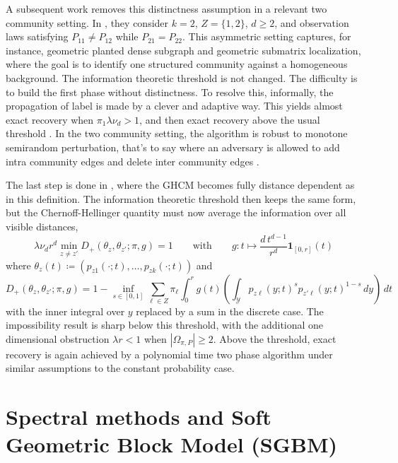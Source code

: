 \documentclass[runningheads]{llncs}
\begin{document}
A subsequent work removes this distinctness assumption in a relevant two community setting. In \citep{gaudio2025sharpexactrecoverythreshold}, they consider \(k=2\), \(Z=\{1,2\}\), \(d\ge 2\), and observation laws satisfying \(P_{11}\neq P_{12}\) while \(P_{21}=P_{22}\).  
This asymmetric setting captures, for instance, geometric planted dense subgraph and geometric submatrix localization, where the goal is to identify one structured community against a homogeneous background. 
The information theoretic threshold is not changed. The difficulty is to build the first phase without distinctness. To resolve this, informally, the propagation of label is made by a clever and adaptive way. This yields almost exact recovery when \(\pi_1\lambda \nu_d>1\), and then exact recovery above the usual threshold \citep{gaudio2025sharpexactrecoverythreshold}. In the two community setting, the algorithm is robust to monotone semirandom perturbation, that's to say where an adversary is allowed to add intra community edges and delete inter community edges \citep{gaudio2024exact}.

The last step is done in \citep{gaudio2026exact}, where the GHCM becomes fully distance dependent as in this definition.
The information theoretic threshold then keeps the same form, but the Chernoff-Hellinger quantity must now average the information over all visible distances,
\[
\lambda \nu_d r^d \min_{z\neq z'} D_+(\theta_z,\theta_{z'};\pi,g)=1
\qquad\text{with}\qquad
g:t\mapsto \frac{d\,t^{d-1}}{r^d}\mathbf 1_{[0,r]}(t)
\]
where \(\theta_z(t)\coloneqq (p_{z1}(\cdot;t),\dots,p_{zk}(\cdot;t))\) and
\[
D_+(\theta_z,\theta_{z'};\pi,g)
=
1-\inf_{s\in[0,1]}
\sum_{\ell\in Z}\pi_\ell
\int_0^r
g(t)
\left(
\int_{\mathcal Y}
p_{z\ell}(y;t)^s p_{z'\ell}(y;t)^{1-s}\,dy
\right)\,dt
\]
with the inner integral over \(y\) replaced by a sum in the discrete case. The impossibility result is sharp below this threshold, with the additional one dimensional obstruction \(\lambda r<1\) when \(|\Omega_{\pi,P}|\ge 2\). Above the threshold, exact recovery is again achieved by a polynomial time two phase algorithm under similar assumptions to the constant probability case.



\section{Spectral methods and Soft Geometric Block Model (SGBM)}
\end{document}
